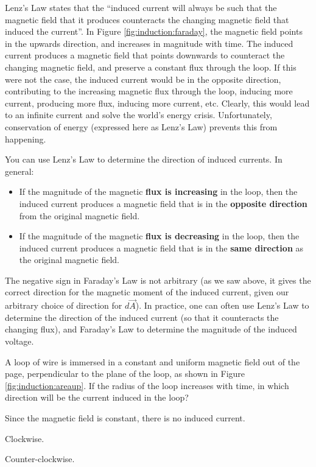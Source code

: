 Lenz's Law states that the ``induced current will always be such that the magnetic field that it produces counteracts the changing magnetic field that induced the current''. In Figure \ref{fig:induction:faraday}, the magnetic field points in the upwards direction, and increases in magnitude with time. The induced current produces a magnetic field that points downwards to counteract the changing magnetic field, and preserve a constant flux through the loop. If this were not the case, the induced current would be in the opposite direction, contributing to the increasing magnetic flux through the loop, inducing more current, producing more flux, inducing more current, etc. Clearly, this would lead to an infinite current and solve the world's energy crisis. Unfortunately, conservation of energy (expressed here as Lenz's Law) prevents this from happening. 

You can use Lenz's Law to determine the direction of induced currents. In general:
\begin{itemize}
\item If the magnitude of the magnetic \textbf{flux is increasing} in the loop, then the induced current produces a magnetic field that is in the \textbf{opposite direction} from the original magnetic field.
\item If the magnitude of the magnetic \textbf{flux is decreasing} in the loop, then the induced current produces a magnetic field that is in the \textbf{same direction} as the original magnetic field.
\end{itemize}

The negative sign in Faraday's Law is not arbitrary (as we saw above, it gives the correct direction for the magnetic moment of the induced current, given our arbitrary choice of direction for $d\vec A$). In practice, one can often use Lenz's Law to determine the direction of the induced current (so that it counteracts the changing flux), and Faraday's Law to determine the magnitude of the induced voltage.

\begin{checkpoint}{}
	\begin{MCquestion}{A loop of wire is immersed in a constant and uniform magnetic field out of the page, perpendicular to the plane of the loop, as shown in Figure \ref{fig:induction:areaup}. If the radius of the loop increases with time, in which direction will be the current induced in the loop?
	}
		\item Since the magnetic field is constant, there is no induced current.
		\item Clockwise. \correct
		\item Counter-clockwise. 
	\end{MCquestion}
\end{checkpoint}

